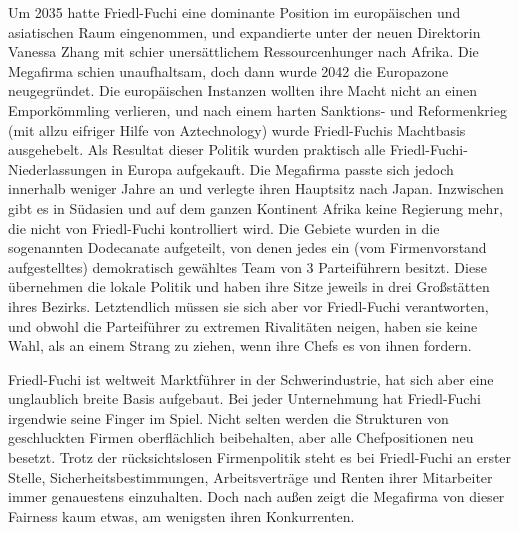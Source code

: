 Um 2035 hatte Friedl-Fuchi eine dominante Position im europäischen und asiatischen Raum eingenommen, und expandierte unter der neuen Direktorin Vanessa Zhang mit schier unersättlichem Ressourcenhunger nach Afrika. Die Megafirma schien unaufhaltsam, doch dann wurde 2042 die Europazone neugegründet. Die europäischen Instanzen wollten ihre Macht nicht an einen Emporkömmling verlieren, und nach einem harten Sanktions- und Reformenkrieg (mit allzu eifriger Hilfe von Aztechnology) wurde Friedl-Fuchis Machtbasis ausgehebelt. Als Resultat dieser Politik wurden praktisch alle Friedl-Fuchi-Niederlassungen in Europa aufgekauft. Die Megafirma passte sich jedoch innerhalb weniger Jahre an und verlegte ihren Hauptsitz nach Japan. Inzwischen gibt es in Südasien und auf dem ganzen Kontinent Afrika keine Regierung mehr, die nicht von Friedl-Fuchi kontrolliert wird. Die Gebiete wurden in die sogenannten Dodecanate aufgeteilt, von denen jedes ein (vom Firmenvorstand aufgestelltes) demokratisch gewähltes Team von 3 Parteiführern besitzt. Diese übernehmen die lokale Politik und haben ihre Sitze jeweils in drei Großstätten ihres Bezirks. Letztendlich müssen sie sich aber vor Friedl-Fuchi verantworten, und obwohl die Parteiführer zu extremen Rivalitäten neigen, haben sie keine Wahl, als an einem Strang zu ziehen, wenn ihre Chefs es von ihnen fordern.

Friedl-Fuchi ist weltweit Marktführer in der Schwerindustrie, hat sich aber eine unglaublich breite Basis aufgebaut. Bei jeder Unternehmung hat Friedl-Fuchi irgendwie seine Finger im Spiel. Nicht selten werden die Strukturen von geschluckten Firmen oberflächlich beibehalten, aber alle Chefpositionen neu besetzt. Trotz der rücksichtslosen Firmenpolitik steht es bei Friedl-Fuchi an erster Stelle, Sicherheitsbestimmungen, Arbeitsverträge und Renten ihrer Mitarbeiter immer genauestens einzuhalten. Doch nach außen zeigt die Megafirma von dieser Fairness kaum etwas, am wenigsten ihren Konkurrenten.
